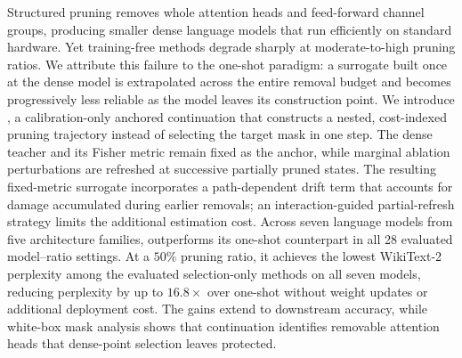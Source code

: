 Structured pruning removes whole attention heads and feed-forward channel groups, producing smaller dense language models that run efficiently on standard hardware. Yet training-free methods degrade sharply at moderate-to-high pruning ratios. We attribute this failure to the one-shot paradigm: a surrogate built once at the dense model is extrapolated across the entire removal budget and becomes progressively less reliable as the model leaves its construction point. We introduce \method, a calibration-only anchored continuation that constructs a nested, cost-indexed pruning trajectory instead of selecting the target mask in one step. The dense teacher and its Fisher metric remain fixed as the anchor, while marginal ablation perturbations are refreshed at successive partially pruned states. The resulting fixed-metric surrogate incorporates a path-dependent drift term that accounts for damage accumulated during earlier removals; an interaction-guided partial-refresh strategy limits the additional estimation cost. Across seven language models from five architecture families, \method outperforms its one-shot counterpart in all 28 evaluated model--ratio settings. At a $50\%$ pruning ratio, it achieves the lowest WikiText-2 perplexity among the evaluated selection-only methods on all seven models, reducing perplexity by up to $16.8\times$ over one-shot without weight updates or additional deployment cost. The gains extend to downstream accuracy, while white-box mask analysis shows that continuation identifies removable attention heads that dense-point selection leaves protected.

